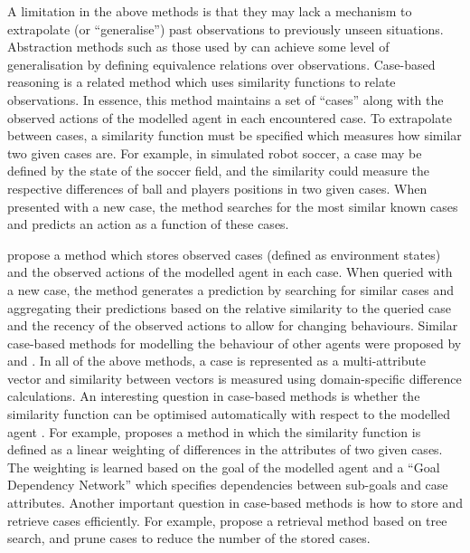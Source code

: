 \documentclass[final,1p,times,authoryear]{elsarticle}
\begin{document}
A limitation in the above methods is that they may lack a mechanism to extrapolate (or ``generalise'') past observations to previously unseen situations. Abstraction methods such as those used by \citet{bdsb2004} can achieve some level of generalisation by defining equivalence relations over observations. Case-based reasoning \citep[e.g.][]{k2014,v1994,h1986} is a related method which uses similarity functions to relate observations. In essence, this method maintains a set of ``cases'' along with the observed actions of the modelled agent in each encountered case. To extrapolate between cases, a similarity function must be specified which measures how similar two given cases are. For example, in simulated robot soccer, a case may be defined by the state of the soccer field, and the similarity could measure the respective differences of ball and players positions in two given cases. When presented with a new case, the method searches for the most similar known cases and predicts an action as a function of these cases.

\citet{ar2013} propose a method which stores observed cases (defined as environment states) and the observed actions of the modelled agent in each case. When queried with a new case, the method generates a prediction by searching for similar cases and aggregating their predictions based on the relative similarity to the queried case and the recency of the observed actions to allow for changing behaviours. Similar case-based methods for modelling the behaviour of other agents were proposed by \citet{bkaa2015} and \citet{hs2008}. In all of the above methods, a case is represented as a multi-attribute vector and similarity between vectors is measured using domain-specific difference calculations. An interesting question in case-based methods is whether the similarity function can be optimised automatically with respect to the modelled agent \citep{s2005,s2004moo,aln2003}. For example, \citet{s2004moo} proposes a method in which the similarity function is defined as a linear weighting of differences in the attributes of two given cases. The weighting is learned based on the goal of the modelled agent and a ``Goal Dependency Network'' which specifies dependencies between sub-goals and case attributes. Another important question in case-based methods is how to store and retrieve cases efficiently. For example, \citet{dh2004} propose a retrieval method based on tree search, and \citet{bkaa2015} prune cases to reduce the number of the stored cases.


\end{document}
